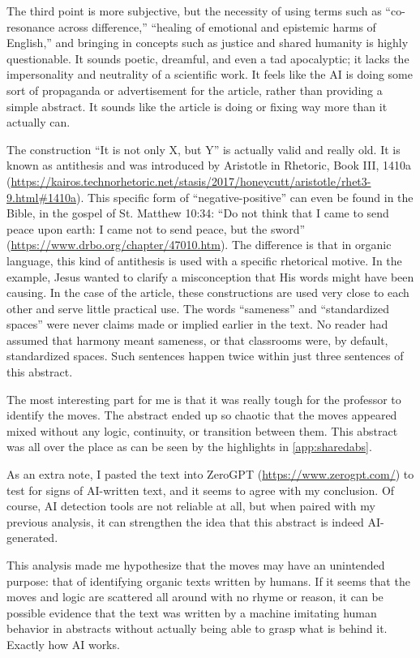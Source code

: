 The third point is more subjective, but the necessity of using terms such as ``co-resonance across difference,'' ``healing of emotional and epistemic harms of English,'' and bringing in concepts such as justice and shared humanity is highly questionable. It sounds poetic, dreamful, and even a tad apocalyptic; it lacks the impersonality and neutrality of a scientific work. It feels like the AI is doing some sort of propaganda or advertisement for the article, rather than providing a simple abstract. It sounds like the article is doing or fixing way more than it actually can.

The construction ``It is not only X, but Y'' is actually valid and really old. It is known as antithesis and was introduced by Aristotle in Rhetoric, Book III, 1410a (\url{https://kairos.technorhetoric.net/stasis/2017/honeycutt/aristotle/rhet3-9.html#1410a}). This specific form of ``negative-positive'' can even be found in the Bible, in the gospel of St. Matthew 10:34: ``Do not think that I came to send peace upon earth: I came not to send peace, but the sword'' (\url{https://www.drbo.org/chapter/47010.htm}). The difference is that in organic language, this kind of antithesis is used with a specific rhetorical motive. In the example, Jesus wanted to clarify a misconception that His words might have been causing. In the case of the article, these constructions are used very close to each other and serve little practical use. The words ``sameness'' and ``standardized spaces'' were never claims made or implied earlier in the text. No reader had assumed that harmony meant sameness, or that classrooms were, by default, standardized spaces. Such sentences happen twice within just three sentences of this abstract.

The most interesting part for me is that it was really tough for the professor to identify the moves. The abstract ended up so chaotic that the moves appeared mixed without any logic, continuity, or transition between them. This abstract was all over the place as can be seen by the highlights in \ref{app:sharedabs}.

As an extra note, I pasted the text into ZeroGPT (\url{https://www.zerogpt.com/}) to test for signs of AI-written text, and it seems to agree with my conclusion. Of course, AI detection tools are not reliable at all, but when paired with my previous analysis, it can strengthen the idea that this abstract is indeed AI-generated.

This analysis made me hypothesize that the moves may have an unintended purpose: that of identifying organic texts written by humans. If it seems that the moves and logic are scattered all around with no rhyme or reason, it can be possible evidence that the text was written by a machine imitating human behavior in abstracts without actually being able to grasp what is behind it. Exactly how AI works.

